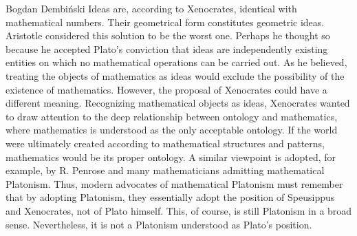 \begin{artengenv}{Bogdan Dembiński}
Ideas are, according to Xenocrates, identical with mathematical numbers. Their geometrical form constitutes geometric
ideas. Aristotle considered this solution to be the worst one. Perhaps he thought so because he accepted Plato’s
conviction that ideas are independently existing entities on which no mathematical operations can be carried out. As he
believed, treating the objects of mathematics as ideas would exclude the possibility of the existence of mathematics. %
However, the proposal of Xenocrates could have a different meaning. Recognizing mathematical objects as ideas,
Xenocrates wanted to draw attention to the deep relationship between ontology and mathematics, where mathematics is
understood as the only acceptable ontology. If the world were ultimately created according to mathematical structures
and patterns, mathematics would be its proper ontology. %
A similar viewpoint is adopted, for example, by R. Penrose and many mathematicians admitting mathematical Platonism. Thus, modern
advocates of mathematical Platonism must remember that by adopting Platonism, they essentially adopt the position of
Speusippus and Xenocrates, not of Plato himself. This, of course, is still Platonism in a broad sense. Nevertheless, it
is not a Platonism understood as Plato’s position.


\end{artengenv}
